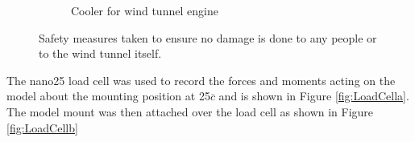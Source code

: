 \begin{figure}[H]
\begin{subfigure}[b]{0.45\textwidth}
                \caption{Cooler for wind tunnel engine}
                \label{fig:engineCooler}
     \end{subfigure}
     \caption{Safety measures taken to ensure no damage is done to any people or to the wind tunnel itself.}
     \label{fig:windTunnelSafety}
\end{figure}


The nano25 load cell was used to record the forces and moments acting on the model about the mounting position at 25$\overline{c}$ and is shown in Figure \ref{fig:LoadCella}. The model mount was then attached over the load cell as shown in Figure \ref{fig:LoadCellb}

